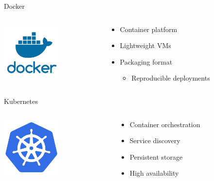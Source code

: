 \documentclass[17pt]{beamer}
\begin{document}
  \begin{frame}{Docker}
    \begin{columns}[c]
      \begin{column}{.2\textwidth}
          \includegraphics[width=3cm,height=3cm]{images/docker_logo.png}
      \end{column}
      \begin{column}{.8\textwidth}
        \begin{itemize}
          \item Container platform
          \item Lightweight VMs
          \item Packaging format
          \begin{itemize}
            \item Reproducible deployments
          \end{itemize}
        \end{itemize}
      \end{column}
    \end{columns}
  \end{frame}

  \begin{frame}{Kubernetes}
    \begin{columns}[c]
      \begin{column}{.2\textwidth}
          \includegraphics[width=3cm,height=3cm]{images/kubernetes_logo.png}
      \end{column}
      \begin{column}{.8\textwidth}
        \begin{itemize}
          \item Container orchestration
          \item Service discovery
          \item Persistent storage
          \item High availability
        \end{itemize}
      \end{column}
    \end{columns}
  \end{frame}
\end{document}
